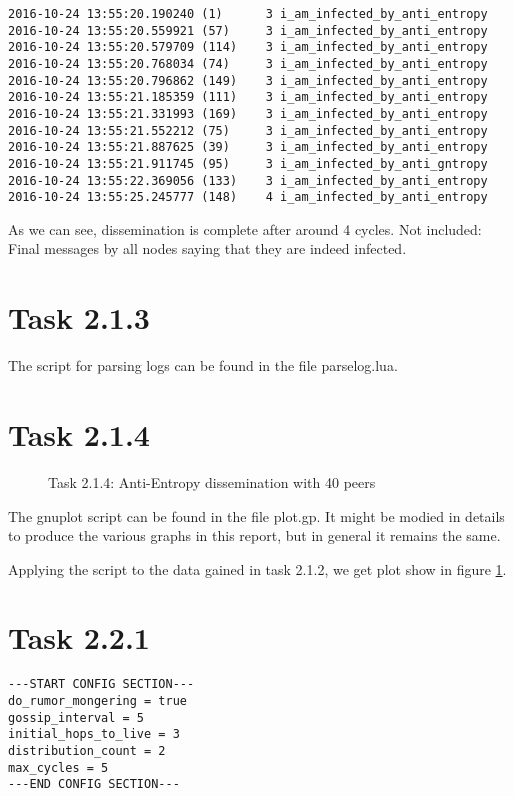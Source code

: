 \documentclass[a4paper]{article}
\begin{document}
\begin{lstlisting}
2016-10-24 13:55:20.190240 (1)      3 i_am_infected_by_anti_entropy
2016-10-24 13:55:20.559921 (57)     3 i_am_infected_by_anti_entropy
2016-10-24 13:55:20.579709 (114)    3 i_am_infected_by_anti_entropy
2016-10-24 13:55:20.768034 (74)     3 i_am_infected_by_anti_entropy
2016-10-24 13:55:20.796862 (149)    3 i_am_infected_by_anti_entropy
2016-10-24 13:55:21.185359 (111)    3 i_am_infected_by_anti_entropy
2016-10-24 13:55:21.331993 (169)    3 i_am_infected_by_anti_entropy
2016-10-24 13:55:21.552212 (75)     3 i_am_infected_by_anti_entropy
2016-10-24 13:55:21.887625 (39)     3 i_am_infected_by_anti_entropy
2016-10-24 13:55:21.911745 (95)     3 i_am_infected_by_anti_gntropy
2016-10-24 13:55:22.369056 (133)    3 i_am_infected_by_anti_entropy
2016-10-24 13:55:25.245777 (148)    4 i_am_infected_by_anti_entropy
\end{lstlisting}

As we can see, dissemination is complete after around 4 cycles. Not included: Final messages by all nodes saying that they are indeed infected.

\section{Task 2.1.3}

The script for parsing logs can be found in the file parselog.lua.

\section{Task 2.1.4}

\begin{figure}
    
    \caption{Task 2.1.4: Anti-Entropy dissemination with 40 peers}
    \label{fig:2-1-4}
\end{figure}

The gnuplot script can be found in the file plot.gp. It might be modied in details to produce the various graphs in this report, but in general it remains the same.

Applying the script to the data gained in task 2.1.2, we get plot show in figure \ref{fig:2-1-4}.

\section{Task 2.2.1}
\begin{lstlisting}
---START CONFIG SECTION---
do_rumor_mongering = true
gossip_interval = 5
initial_hops_to_live = 3
distribution_count = 2
max_cycles = 5
---END CONFIG SECTION---
\end{lstlisting}
\end{document}
